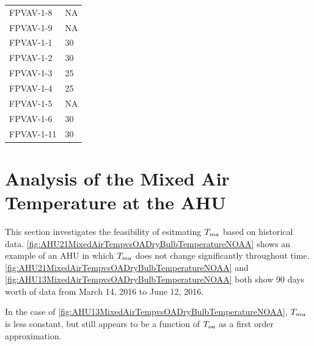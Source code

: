 \begin{table}[]
\begin{tabular}{ll}
FPVAV-1-8           & NA               \\
FPVAV-1-9           & NA               \\
FPVAV-1-1           & 30               \\
FPVAV-1-2           & 30               \\
FPVAV-1-3           & 25               \\
FPVAV-1-4           & 25               \\
FPVAV-1-5           & NA               \\
FPVAV-1-6           & 30               \\
FPVAV-1-11          & 30               \\ \bottomrule
\end{tabular}
\end{table}




\section{Analysis of the Mixed Air Temperature at the AHU}

This section investigates the feasibility of esitmating \(T_{ma}\) based on historical data. \figref{} \ref{fig:AHU21MixedAirTempvsOADryBulbTemperatureNOAA} shows an example of an AHU in which \(T_{ma}\) does not change significantly throughout time. \figref{} \ref{fig:AHU21MixedAirTempvsOADryBulbTemperatureNOAA} and \ref{fig:AHU13MixedAirTempvsOADryBulbTemperatureNOAA} both show 90 days worth of data from March 14, 2016 to June 12, 2016. 

In the case of \figref{} \ref{fig:AHU13MixedAirTempvsOADryBulbTemperatureNOAA}, \(T_{ma}\) is less constant, but still appears to be a function of \(T_{oa}\) as a first order approximation. 


